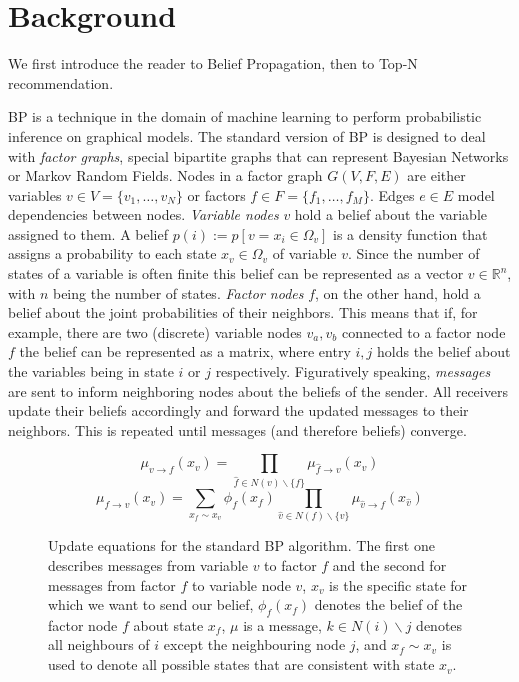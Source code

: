 \section{Background}\label{sec:background}
We first introduce the reader to Belief Propagation, then to Top-N recommendation.

BP is a technique in the domain of machine learning to perform probabilistic inference on graphical models. The standard version of BP is designed to deal with \textit{factor graphs}, special bipartite graphs that can represent Bayesian Networks or Markov Random Fields. Nodes in a factor graph $G(V,F,E)$ are either variables $v \in V = \{ v_1, \ldots, v_N \}$ or factors $f \in F = \{f_1, \ldots, f_M \}$. Edges $e\in E$ model dependencies between nodes.
\textit{Variable nodes} $v$ hold a belief about the variable assigned to them. A belief $p(i):=p[v=x_i\in\Omega_{v}]$ is a density function that assigns a probability to each state $x_v \in \Omega_v$ of variable $v$. Since the number of states of a variable is often finite this belief can be represented as a vector $v \in \mathbb{R}^n$, with $n$ being the number of states. 
\textit{Factor nodes} $f$, on the other hand, hold a belief about the joint probabilities of their neighbors. 
This means that if, for example, there are two (discrete) variable nodes $v_a, v_b$ connected to a factor node $f$ the belief can be represented as a matrix, where entry $i,j$ holds the belief about the variables being in state $i$ or $j$ respectively. Figuratively speaking, \textit{messages} are sent to inform neighboring nodes about the beliefs of the sender. All receivers update their beliefs accordingly and forward the updated messages to their neighbors. This is repeated until messages (and therefore beliefs) converge. 

\begin{figure}
\begin{equation*}                                                            
\mu_{v\rightarrow f}(x_v) = \prod_{\hat f \in N(v)\backslash \{f\}} \mu_{\hat f\rightarrow v}(x_v)
\end{equation*}
\begin{equation*}                                                            
\mu_{f\rightarrow v}(x_v) = \sum_{x_f \sim x_v}\phi_f(x_f) \prod_{\hat v \in N(f)\backslash \{v\}} \mu_{\hat v\rightarrow f}(x_{\hat v})
\end{equation*}
\caption{Update equations for the standard BP algorithm. The first one describes messages from variable $v$ to factor $f$ and the second for messages from factor $f$ to variable node $v$, $x_v$ is the specific state for which we want to send our belief, $\phi_f(x_f)$ denotes the belief of the factor node $f$ about state $x_f$, $\mu$ is a message, $k \in N(i)\backslash j$ denotes all neighbours of $i$ except the neighbouring node $j$, and $x_f \sim x_v$ is used to denote all possible states that are consistent with state $x_v$.}
\label{eqn_bp_message}
\end{figure}

